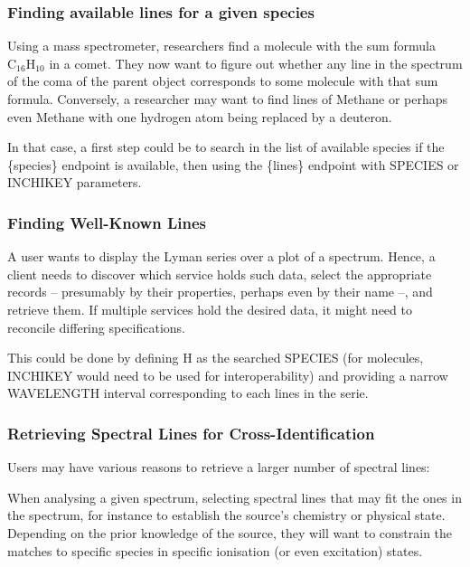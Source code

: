 \documentclass[11pt,a4paper]{ivoa}
\begin{document}
\subsubsection{Finding available lines for a given species}
\label{sect:finding-all}

Using a mass spectrometer, researchers find a molecule with the sum formula $\textrm{C}_{16}\textrm{H}_{10}$ in a comet.
They now want to figure out whether any line in the spectrum of the coma of the parent object corresponds
to some molecule with that sum formula. Conversely, a researcher may want to find lines of Methane or perhaps even Methane
with one hydrogen atom being replaced by a deuteron.

In that case,  a first step could be to search in the list of available species if the \{species\} endpoint is available,
then using the \{lines\} endpoint with SPECIES or INCHIKEY parameters.

\subsubsection{Finding Well-Known Lines}
\label{sect:finding-known-line}

A user wants to display the Lyman series over a plot of a spectrum. Hence, a client needs to discover which service holds such data,
select the appropriate records -- presumably by their properties, perhaps even by their name --, and retrieve them.
If multiple services hold the desired data, it might need to reconcile differing specifications.

This could be done by defining H as the searched SPECIES (for molecules, INCHIKEY would need to be used for interoperability)
and providing a narrow WAVELENGTH interval corresponding to each lines in the serie.

\subsubsection[Retrieving Spectral Lines for Cross-Identification]{Retrieving Spectral Lines for Cross-Identification}
\label{sect:line-cross-id}

Users may have various reasons to retrieve a larger number of spectral lines:

    When analysing a given spectrum, selecting spectral lines that may fit the ones in the spectrum, for instance to establish
    the source's chemistry or physical state. Depending on the prior knowledge of the source,
    they will want to constrain the matches to specific species in specific ionisation (or even excitation) states.
\end{document}
